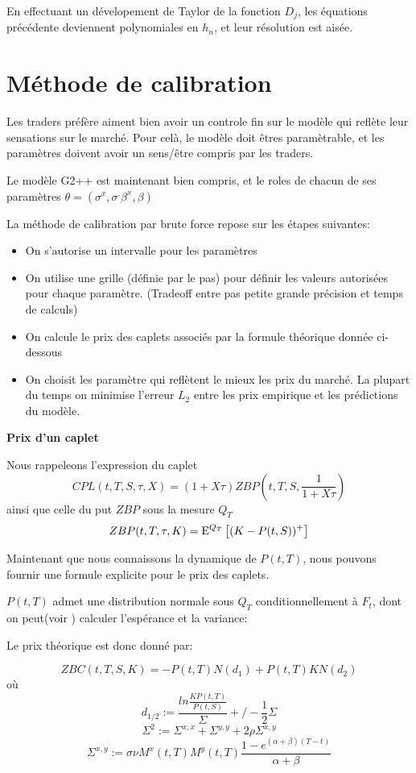 En effectuant un dévelopement de Taylor de la fonction $D_j$, les équations précédente deviennent polynomiales en $h_n$, et leur résolution est aisée.

\section{Méthode de calibration}
Les traders préfère aiment bien avoir un controle fin sur le modèle qui reflète leur sensations sur le marché. Pour celà, le modèle doit êtres paramètrable, et les paramètres doivent avoir un sens/être compris par les traders.

Le modèle G2++ est maintenant bien compris, et le roles de chacun de ses paramètres $\theta = (\sigma^x, \sigma^, \beta^x, \beta)$ 

La méthode de calibration par brute force repose sur les étapes suivantes:
\begin{itemize}
\item On s'autorise un intervalle pour les paramètres
\item On utilise une grille (définie par le pas) pour définir les valeurs
  autorisées pour chaque paramètre. (Tradeoff entre pas petite grande
  précision et temps de calculs)
\item On calcule le prix des caplets associés par la formule théorique donnée ci-dessous
\item On choisit les paramètre qui reflètent le mieux les prix du marché. La plupart du temps on minimise l'erreur $L_2$ entre les prix empirique et les prédictions du modèle. 
\end{itemize}

\textbf{Prix d'un caplet}

Nous rappeleons l'expression du caplet 
$$CPL(t, T, S, \tau, X) = (1+X \tau) ZBP(t, T, S, \frac{1}{1+X \tau})$$
ainsi que celle du put $ZBP$ sous la mesure $Q_T$
$$ZBP(t, T, \tau, K) = \mathrm{E}^{Q_T} \left[  (K-P(t, S))^+  \right] $$

Maintenant que nous connaissons la dynamique de $P(t, T)$, nous pouvons fournir une formule explicite pour le prix des caplets.

$P(t, T)$ admet une distribution normale sous $Q_T$ conditionnellement à $F_t$,
dont on peut(voir \cite{Brugo}) calculer l'espérance et la variance:

Le prix théorique est donc donné par:

$$ZBC(t, T, S, K) = -P(t, T) N( d_1 ) + P(t, T) K N(d_2)$$
où
$$d_{1/2} := \frac{ln \frac{KP(t, T)}{P(t, S)}}{\Sigma} +/- \frac{1}{2}\Sigma $$
$$\Sigma^2 := \Sigma^{x,x} + \Sigma^{y,y} + 2 \rho \Sigma^{x,y}$$
$$\Sigma^{x,y} := \sigma \nu M^x(t, T) M^y(t, T) \frac{1 - e^{(\alpha+\beta) (T-t)}}{\alpha+\beta} $$

